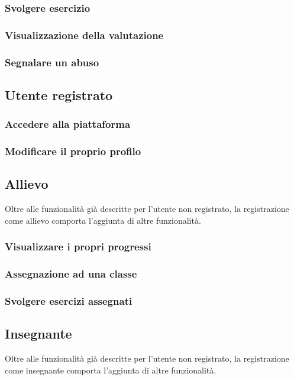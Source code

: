 \documentclass[11pt,a4paper]{article}
\begin{document}
{		\subsubsection{Svolgere esercizio}
		\subsubsection{Visualizzazione della valutazione}
		\subsubsection{Segnalare un abuso}
	
	\subsection{Utente registrato}
		\subsubsection{Accedere alla piattaforma}
		\subsubsection{Modificare il proprio profilo}
	
	\subsection{Allievo}
		Oltre alle funzionalità già descritte per l'utente non registrato, la registrazione come allievo comporta l'aggiunta di altre funzionalità.
		\subsubsection{Visualizzare i propri progressi}
		\subsubsection{Assegnazione ad una classe}
		\subsubsection{Svolgere esercizi assegnati}
	
	\subsection{Insegnante}
		Oltre alle funzionalità già descritte per l'utente non registrato, la registrazione come insegnante comporta l'aggiunta di altre funzionalità.
}
\end{document}
